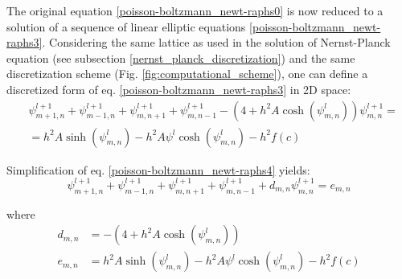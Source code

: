 The original equation \eqref{poisson-boltzmann_newt-raphs0} is now reduced to a solution of a sequence of linear elliptic equations \eqref{poisson-boltzmann_newt-raphs3}. Considering the same lattice as used in the solution of Nernst-Planck equation (see subsection \ref{nernst_planck_discretization}) and the same discretization scheme (Fig. \ref{fig:computational_scheme}), one can define a discretized form of eq. \eqref{poisson-boltzmann_newt-raphs3} in 2D space:
\begin{align}
 \label{poisson-boltzmann_newt-raphs4}&\psi^{l+1}_{m+1,n}+\psi^{l+1}_{m-1,n}+\psi^{l+1}_{m,n+1}+\psi^{l+1}_{m,n-1}-(4+h^2A\cosh(\psi^l_{m,n}))\psi^{l+1}_{m,n} = \nonumber \\
 &=h^2A\sinh(\psi^l_{m,n}) - h^2A\psi^l\cosh(\psi^l_{m,n}) - h^2f(c) 
\end{align}

Simplification of eq. \eqref{poisson-boltzmann_newt-raphs4} yields:
\begin{equation}
  \label{poisson-boltzmann_newt-raphs5}\psi^{l+1}_{m+1,n}+\psi^{l+1}_{m-1,n}+\psi^{l+1}_{m,n+1}+\psi^{l+1}_{m,n-1}+d_{m,n}\psi^{l+1}_{m,n} = e_{m,n} 
\end{equation}

where 
\begin{align}
\label{newton-raphson_coefficients}
 d_{m,n} &= -(4+h^2A\cosh(\psi^l_{m,n})) \nonumber \\
 e_{m,n} &= h^2A\sinh(\psi^l_{m,n}) - h^2A\psi^l\cosh(\psi^l_{m,n}) - h^2f(c)
\end{align}

